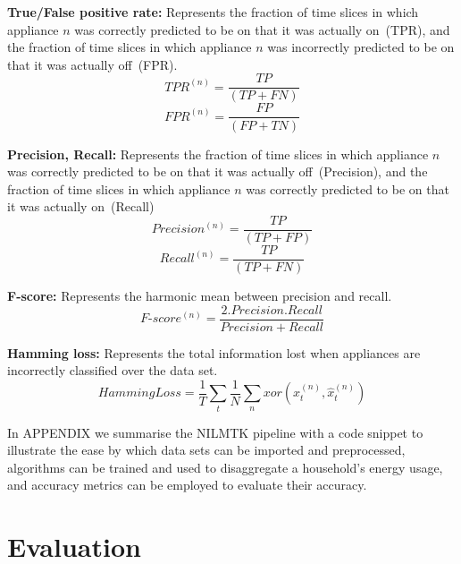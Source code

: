 \documentclass{sig-alternate}
\begin{document}
\textbf{True/False positive rate:} Represents the fraction of time slices in which appliance $n$ was correctly predicted to be on that it was actually on~(TPR), and the fraction of time slices in which appliance $n$ was incorrectly predicted to be on that it was actually off~(FPR).
\begin{equation}
TPR^{(n)} = \frac{TP}{\left ( TP + FN \right )}
\end{equation}
\begin{equation}
FPR^{(n)} = \frac{FP}{\left ( FP + TN \right )}
\end{equation}

\textbf{Precision, Recall:} Represents the fraction of time slices in which appliance $n$ was correctly predicted to be on that it was actually off~(Precision), and the fraction of time slices in which appliance $n$ was correctly predicted to be on that it was actually on~(Recall)
\begin{equation}
Precision^{(n)} = \frac{TP}{\left ( TP + FP \right )}
\end{equation}
\begin{equation}
Recall^{(n)} = \frac{TP}{\left ( TP + FN \right )}
\end{equation}

\textbf{F-score:} Represents the harmonic mean between precision and recall.
\begin{equation}
F\text{-}score^{(n)} = \frac
            {2 . Precision . Recall}
            {Precision + Recall}
\end{equation}

\textbf{Hamming loss:} Represents the total information lost when appliances are incorrectly classified over the data set.
\begin{equation}
HammingLoss = 
        \frac{1}{T} \sum_{t}
        \frac{1}{N} \sum_{n}
        xor \left ( x^{(n)}_t, \hat{x}^{(n)}_t \right )
\end{equation}



\noindent
In APPENDIX we summarise the NILMTK pipeline with a code snippet to illustrate the ease by which data sets can be imported and preprocessed, algorithms can be trained and used to disaggregate a household's energy usage, and accuracy metrics can be employed to evaluate their accuracy.


\section{Evaluation}
\label{evaluation}
\end{document}
